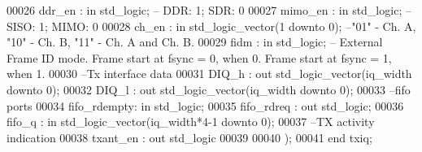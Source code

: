 \begin{DoxyCode}
00026         \textcolor{vhdlchar}{ddr_en}      \textcolor{vhdlchar}{:} \textcolor{keywordflow}{in} \textcolor{comment}{std\_logic};\textcolor{keyword}{ -- DDR: 1; SDR: 0}
00027         \textcolor{vhdlchar}{mimo_en}     \textcolor{vhdlchar}{:} \textcolor{keywordflow}{in} \textcolor{comment}{std\_logic};\textcolor{keyword}{ -- SISO: 1; MIMO: 0}
00028         \textcolor{vhdlchar}{ch_en}           \textcolor{vhdlchar}{:} \textcolor{keywordflow}{in} \textcolor{comment}{std\_logic\_vector}\textcolor{vhdlchar}{(}\textcolor{vhdllogic}{}\textcolor{vhdllogic}{1} \textcolor{keywordflow}{downto} \textcolor{vhdllogic}{}\textcolor{vhdllogic}{0}\textcolor{vhdlchar}{)};\textcolor{keyword}{ --"01" - Ch. A, "10" - Ch. B, "11" - Ch. A and
       Ch. B.  }
00029         \textcolor{vhdlchar}{fidm}            \textcolor{vhdlchar}{:} \textcolor{keywordflow}{in} \textcolor{comment}{std\_logic};\textcolor{keyword}{ -- External Frame ID mode. Frame start at fsync = 0, when 0. Frame
       start at fsync = 1, when 1.}
00030 \textcolor{keyword}{      --Tx interface data }
00031       \textcolor{vhdlchar}{DIQ_h}         \textcolor{vhdlchar}{:} \textcolor{keywordflow}{out} \textcolor{comment}{std\_logic\_vector}\textcolor{vhdlchar}{(}\textcolor{vhdlchar}{iq_width} \textcolor{keywordflow}{downto} \textcolor{vhdllogic}{}\textcolor{vhdllogic}{0}\textcolor{vhdlchar}{)};
00032         \textcolor{vhdlchar}{DIQ_l}          \textcolor{vhdlchar}{:} \textcolor{keywordflow}{out} \textcolor{comment}{std\_logic\_vector}\textcolor{vhdlchar}{(}\textcolor{vhdlchar}{iq_width} \textcolor{keywordflow}{downto} \textcolor{vhdllogic}{}\textcolor{vhdllogic}{0}\textcolor{vhdlchar}{)};
00033 \textcolor{keyword}{      --fifo ports }
00034       \textcolor{vhdlchar}{fifo_rdempty}\textcolor{vhdlchar}{:} \textcolor{keywordflow}{in} \textcolor{comment}{std\_logic};
00035       \textcolor{vhdlchar}{fifo_rdreq}  \textcolor{vhdlchar}{:} \textcolor{keywordflow}{out} \textcolor{comment}{std\_logic};
00036       \textcolor{vhdlchar}{fifo_q}      \textcolor{vhdlchar}{:} \textcolor{keywordflow}{in} \textcolor{comment}{std\_logic\_vector}\textcolor{vhdlchar}{(}\textcolor{vhdlchar}{iq_width}\textcolor{vhdlchar}{*}\textcolor{vhdllogic}{4-1} \textcolor{keywordflow}{downto} \textcolor{vhdllogic}{}\textcolor{vhdllogic}{0}\textcolor{vhdlchar}{)};
00037 \textcolor{keyword}{      --TX activity indication}
00038       \textcolor{vhdlchar}{txant_en}    \textcolor{vhdlchar}{:} \textcolor{keywordflow}{out} \textcolor{comment}{std\_logic}
00039       
00040         \textcolor{vhdlchar}{)};
00041 \textcolor{keywordflow}{end} \textcolor{vhdlchar}{txiq};

\end{DoxyCode}
